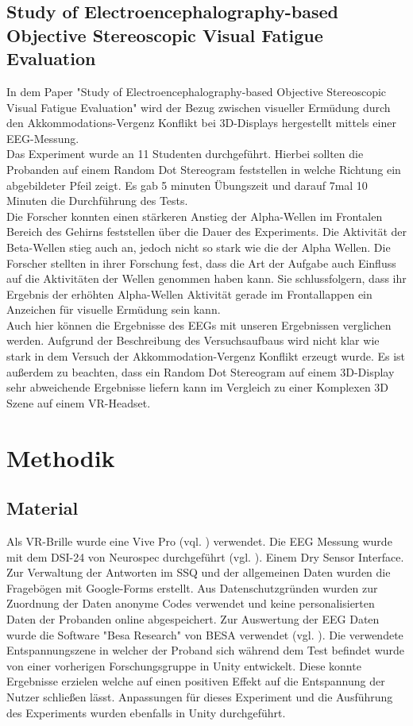 \documentclass[conference]{IEEEtran}
\begin{document}
\subsection{Study of Electroencephalography-based Objective Stereoscopic Visual Fatigue Evaluation}
In dem Paper "Study of Electroencephalography-based Objective Stereoscopic Visual Fatigue Evaluation" \cite{b5} wird der Bezug zwischen visueller Ermüdung durch den Akkommodations-Vergenz Konflikt bei 3D-Displays hergestellt mittels einer EEG-Messung.\\
Das Experiment wurde an 11 Studenten durchgeführt. Hierbei sollten die Probanden auf einem Random Dot Stereogram feststellen in welche Richtung ein abgebildeter Pfeil zeigt. Es gab 5 minuten Übungszeit und darauf 7mal 10 Minuten die Durchführung des Tests.\\
Die Forscher konnten einen stärkeren Anstieg der Alpha-Wellen im Frontalen Bereich des Gehirns feststellen über die Dauer des Experiments. Die Aktivität der Beta-Wellen stieg auch an, jedoch nicht so stark wie die der Alpha Wellen. Die Forscher stellten in ihrer Forschung fest, dass die Art der Aufgabe auch Einfluss auf die Aktivitäten der Wellen genommen haben kann. Sie schlussfolgern, dass ihr Ergebnis der erhöhten Alpha-Wellen Aktivität gerade im Frontallappen ein Anzeichen für visuelle Ermüdung sein kann.\\
Auch hier können die Ergebnisse des EEGs mit unseren Ergebnissen verglichen werden. Aufgrund der Beschreibung des Versuchsaufbaus wird nicht klar wie stark in dem Versuch der Akkommodation-Vergenz Konflikt erzeugt wurde. Es ist außerdem zu beachten, dass ein Random Dot Stereogram auf einem 3D-Display sehr abweichende Ergebnisse liefern kann im Vergleich zu einer Komplexen 3D Szene auf einem VR-Headset.
 

\section{Methodik}
\subsection{Material}
Als VR-Brille wurde eine Vive Pro (vql. \cite{b11}) verwendet. Die EEG Messung wurde mit dem DSI-24 von Neurospec durchgeführt (vgl. \cite{b9}). Einem Dry Sensor Interface. Zur Verwaltung der Antworten im SSQ und der allgemeinen Daten wurden die Fragebögen mit Google-Forms erstellt. Aus Datenschutzgründen wurden zur Zuordnung der Daten anonyme Codes verwendet und keine personalisierten Daten der Probanden online abgespeichert. Zur Auswertung der EEG Daten wurde die Software "Besa Research" von BESA verwendet (vgl. \cite{b10}). Die verwendete Entspannungszene in welcher der Proband sich während dem Test befindet wurde von einer vorherigen Forschungsgruppe in Unity entwickelt. Diese konnte Ergebnisse erzielen welche auf einen positiven Effekt auf die Entspannung der Nutzer schließen lässt. Anpassungen für dieses Experiment und die Ausführung des Experiments wurden ebenfalls in Unity durchgeführt.
\end{document}
